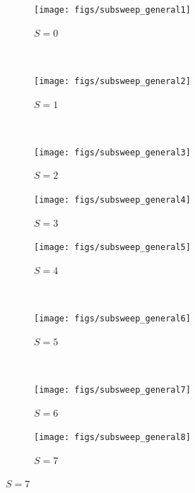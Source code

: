 \begin{figure}
    \centering
    \begin{subfigure}[b]{0.2\textwidth}
        \texttt{[image: figs/subsweep\_general1]}
        \caption{$S=0$}
        \label{fig:subsweep_general1}
    \end{subfigure}
    ~ %
    \begin{subfigure}[b]{0.2\textwidth}
        \texttt{[image: figs/subsweep\_general2]}
        \caption{$S=1$}
        \label{fig:subsweep_general2}
    \end{subfigure}
    ~ %
    \begin{subfigure}[b]{0.2\textwidth}
        \texttt{[image: figs/subsweep\_general3]}
        \caption{$S=2$}
        \label{fig:subsweep_general3}
    \end{subfigure}
    \begin{subfigure}[b]{0.2\textwidth}
        \texttt{[image: figs/subsweep\_general4]}
        \caption{$S=3$}
        \label{fig:subsweep_general4}
    \end{subfigure}
    
    \begin{subfigure}[b]{0.2\textwidth}
        \texttt{[image: figs/subsweep\_general5]}
        \caption{$S=4$}
        \label{fig:subsweep_general5}
    \end{subfigure}
    ~ %
    \begin{subfigure}[b]{0.2\textwidth}
        \texttt{[image: figs/subsweep\_general6]}
        \caption{$S=5$}
        \label{fig:subsweep_general6}
    \end{subfigure}
    ~ %
    \begin{subfigure}[b]{0.2\textwidth}
        \texttt{[image: figs/subsweep\_general7]}
        \caption{$S=6$}
        \label{fig:subsweep_general7}
    \end{subfigure}
    \begin{subfigure}[b]{0.2\textwidth}
        \texttt{[image: figs/subsweep\_general8]}
        \caption{$S=7$}
        \label{fig:subsweep_general8}
    \end{subfigure}
    

\end{figure}
